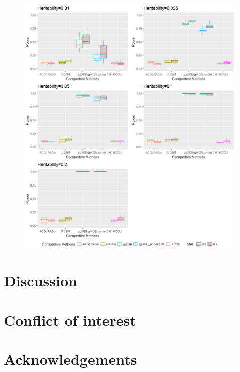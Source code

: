 \documentclass[11pt]{article}
\theoremstyle{plain}
\theoremstyle{definition}
\theoremstyle{remark}
\begin{document}
\begin{figure}[H]
    \begin{center}
       \includegraphics[scale=0.6]{Rplot02.png}
    \end{center}
\end{figure}

\section{Discussion}

\section{Conflict of interest}

\section{Acknowledgements}
\end{document}
